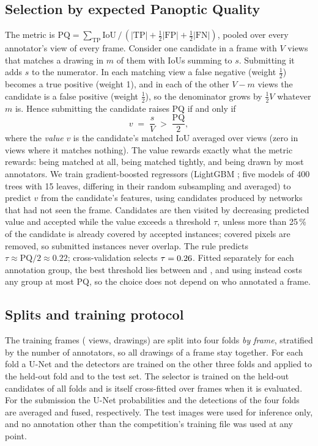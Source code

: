\documentclass[sigconf]{acmart}
\begin{document}
\subsection{Selection by expected Panoptic Quality}\label{sec:selection}
    The metric is $\mathrm{PQ}=\sum_{\mathrm{TP}}\mathrm{IoU}\,/\,(|\mathrm{TP}|+\tfrac12|\mathrm{FP}|+\tfrac12|\mathrm{FN}|)$, pooled over every annotator's view of every frame. Consider one candidate in a frame with $V$ views that matches a drawing in $m$ of them with IoUs summing to $s$. Submitting it adds $s$ to the numerator. In each matching view a false negative (weight $\tfrac12$) becomes a true positive (weight 1), and in each of the other $V-m$ views the candidate is a false positive (weight $\tfrac12$), so the denominator grows by $\tfrac12 V$ whatever $m$ is. Hence submitting the candidate raises PQ if and only if
    \begin{equation}
        v \;=\; \frac{s}{V} \;>\; \frac{\mathrm{PQ}}{2},
    \end{equation}
    where the \emph{value} $v$ is the candidate's matched IoU averaged over views (zero in views where it matches nothing). The value rewards exactly what the metric rewards: being matched at all, being matched tightly, and being drawn by most annotators. We train gradient-boosted regressors (LightGBM \cite{ke2017lightgbm}; five models of 400 trees with 15 leaves, differing in their random subsampling and averaged) to predict $v$ from the candidate's features, using candidates produced by networks that had not seen the frame. Candidates are then visited by decreasing predicted value and accepted while the value exceeds a threshold $\tau$, unless more than 25\,\% of the candidate is already covered by accepted instances; covered pixels are removed, so submitted instances never overlap. The rule predicts $\tau\approx\mathrm{PQ}/2\approx0.22$; cross-validation selects $\tau=0.26{}$. Fitted separately for each annotation group, the best threshold lies between \tauGroupMin{} and \tauGroupMax{}, and using \tauChosen{} instead costs any group at most \tauGroupLoss{} PQ, so the choice does not depend on who annotated a frame.

\subsection{Splits and training protocol}
    The \nFrames{} training frames (\nViews{} views, \nDrawings{} drawings) are split into four folds \emph{by frame}, stratified by the number of annotators, so all drawings of a frame stay together. For each fold a U-Net and the detectors are trained on the other three folds and applied to the held-out fold and to the test set. The selector is trained on the held-out candidates of all folds and is itself cross-fitted over frames when it is evaluated. For the submission the U-Net probabilities and the detections of the four folds are averaged and fused, respectively. The test images were used for inference only, and no annotation other than the competition's training file was used at any point.
\end{document}
